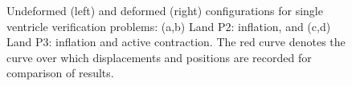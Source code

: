 \begin{figure}[ht]
{\label{fig:ventricles3}}		
%
\caption{Undeformed (left) and deformed (right) configurations for single ventricle verification problems: (a,b) Land P2: inflation, and (c,d) Land P3: inflation and active contraction. The red curve denotes the curve over which displacements and positions are recorded for comparison of results.}
\label{fig:ventricles}
\end{figure}

